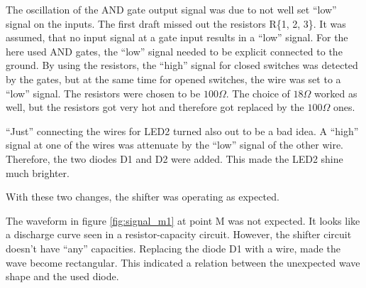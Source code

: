 \documentclass[journal]{IEEEtran}
\begin{document}
The oscillation of the AND gate output signal was due to not well set ``low''
signal on the inputs. The first draft missed out the resistors R\{1, 2, 3\}. It
was assumed, that no input signal at a gate input results in a ``low'' signal.
For the here used AND gates, the ``low'' signal needed to be explicit connected to the ground. By using the resistors, the ``high'' signal
for closed switches was detected by the gates, but at the same time for opened
switches, the wire was set to a ``low'' signal. The resistors were chosen to be
$100\Omega$. The choice of $18\Omega$ worked as well, but the resistors got very
hot and therefore got replaced by the $100\Omega$ ones. 

``Just'' connecting the wires for LED2 turned also out to be a bad idea.
A ``high'' signal at one of the wires was attenuate by the ``low'' signal of
the other wire. Therefore, the two diodes D1 and D2 were added. This made the
LED2 shine much brighter.

With these two changes, the shifter was operating as expected.

The waveform in figure \ref{fig:signal_m1} at point M was not expected. It looks
like a discharge curve seen in a resistor-capacity circuit. However, the shifter circuit doesn't
have ``any'' capacities. Replacing the diode D1 with a wire, made the wave
become rectangular. This indicated a relation between the unexpected wave
shape and the used diode.
\end{document}
